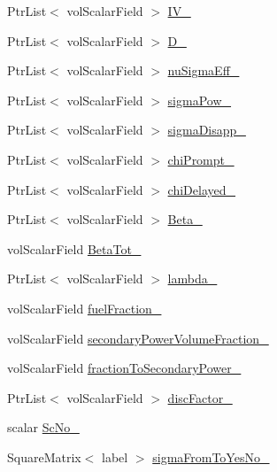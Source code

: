 \begin{DoxyCompactItemize}
Ptr\+List$<$ vol\+Scalar\+Field $>$ \hyperlink{classFoam_1_1XSLowMem_a931edd829a09bca4fb290036a3971f1d}{I\+V\+\_\+}
\item 
Ptr\+List$<$ vol\+Scalar\+Field $>$ \hyperlink{classFoam_1_1XSLowMem_a96fec6b80cb2df43e7ea27107115e475}{D\+\_\+}
\item 
Ptr\+List$<$ vol\+Scalar\+Field $>$ \hyperlink{classFoam_1_1XSLowMem_ad9ea9685d6576d9868c809bb50a504fa}{nu\+Sigma\+Eff\+\_\+}
\item 
Ptr\+List$<$ vol\+Scalar\+Field $>$ \hyperlink{classFoam_1_1XSLowMem_a2bd39d2565aedaffcd623ae0adbd4921}{sigma\+Pow\+\_\+}
\item 
Ptr\+List$<$ vol\+Scalar\+Field $>$ \hyperlink{classFoam_1_1XSLowMem_a2999bf91da8ba50addd3ea539d873d50}{sigma\+Disapp\+\_\+}
\item 
Ptr\+List$<$ vol\+Scalar\+Field $>$ \hyperlink{classFoam_1_1XSLowMem_aed62b74823cc5c088012d6ae59d23c1d}{chi\+Prompt\+\_\+}
\item 
Ptr\+List$<$ vol\+Scalar\+Field $>$ \hyperlink{classFoam_1_1XSLowMem_ab5552da3b10e90d186bf98aead06bcd4}{chi\+Delayed\+\_\+}
\item 
Ptr\+List$<$ vol\+Scalar\+Field $>$ \hyperlink{classFoam_1_1XSLowMem_a7f7fe9267b6666b38fa5534851251f7b}{Beta\+\_\+}
\item 
vol\+Scalar\+Field \hyperlink{classFoam_1_1XSLowMem_aada58fbe9089eb21ee65471a6e424c93}{Beta\+Tot\+\_\+}
\item 
Ptr\+List$<$ vol\+Scalar\+Field $>$ \hyperlink{classFoam_1_1XSLowMem_a5c475176377784b2717714cb353fa3c0}{lambda\+\_\+}
\item 
vol\+Scalar\+Field \hyperlink{classFoam_1_1XSLowMem_a84c8e05dd16ae93d11fcbcf94b099f3f}{fuel\+Fraction\+\_\+}
\item 
vol\+Scalar\+Field \hyperlink{classFoam_1_1XSLowMem_aa28c5a5068196250beec05e9965ff0eb}{secondary\+Power\+Volume\+Fraction\+\_\+}
\item 
vol\+Scalar\+Field \hyperlink{classFoam_1_1XSLowMem_a76bb21d48d91e623afe804402160c87a}{fraction\+To\+Secondary\+Power\+\_\+}
\item 
Ptr\+List$<$ vol\+Scalar\+Field $>$ \hyperlink{classFoam_1_1XSLowMem_a2195b3c3e3a904c4e04924328f611d5c}{disc\+Factor\+\_\+}
\item 
scalar \hyperlink{classFoam_1_1XSLowMem_a4c4a4ba88fdfadec3edee27595650f75}{Sc\+No\+\_\+}
\item 
Square\+Matrix$<$ label $>$ \hyperlink{classFoam_1_1XSLowMem_afa1e84a5e3b0012dbc2e05ef26ca698c}{sigma\+From\+To\+Yes\+No\+\_\+}
\item 

\end{DoxyCompactItemize}
